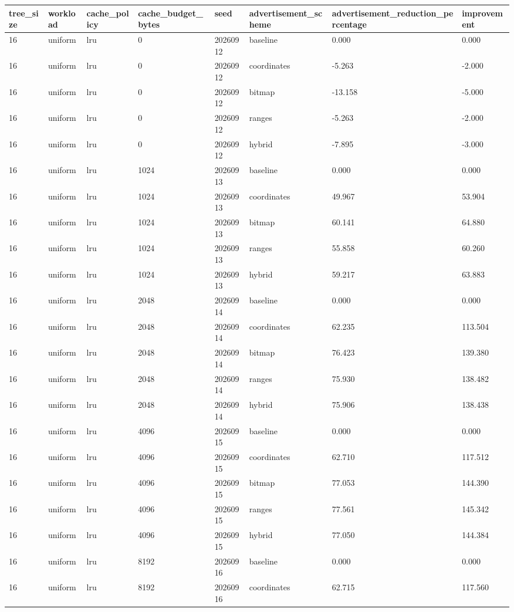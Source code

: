 \begin{tabular}{llllllll}
tree\_size & workload & cache\_policy & cache\_budget\_bytes & seed & advertisement\_scheme & advertisement\_reduction\_percentage & improvement \\ \hline
16 & uniform & lru & 0 & 20260912 & baseline & 0.000 & 0.000 \\
16 & uniform & lru & 0 & 20260912 & coordinates & -5.263 & -2.000 \\
16 & uniform & lru & 0 & 20260912 & bitmap & -13.158 & -5.000 \\
16 & uniform & lru & 0 & 20260912 & ranges & -5.263 & -2.000 \\
16 & uniform & lru & 0 & 20260912 & hybrid & -7.895 & -3.000 \\
16 & uniform & lru & 1024 & 20260913 & baseline & 0.000 & 0.000 \\
16 & uniform & lru & 1024 & 20260913 & coordinates & 49.967 & 53.904 \\
16 & uniform & lru & 1024 & 20260913 & bitmap & 60.141 & 64.880 \\
16 & uniform & lru & 1024 & 20260913 & ranges & 55.858 & 60.260 \\
16 & uniform & lru & 1024 & 20260913 & hybrid & 59.217 & 63.883 \\
16 & uniform & lru & 2048 & 20260914 & baseline & 0.000 & 0.000 \\
16 & uniform & lru & 2048 & 20260914 & coordinates & 62.235 & 113.504 \\
16 & uniform & lru & 2048 & 20260914 & bitmap & 76.423 & 139.380 \\
16 & uniform & lru & 2048 & 20260914 & ranges & 75.930 & 138.482 \\
16 & uniform & lru & 2048 & 20260914 & hybrid & 75.906 & 138.438 \\
16 & uniform & lru & 4096 & 20260915 & baseline & 0.000 & 0.000 \\
16 & uniform & lru & 4096 & 20260915 & coordinates & 62.710 & 117.512 \\
16 & uniform & lru & 4096 & 20260915 & bitmap & 77.053 & 144.390 \\
16 & uniform & lru & 4096 & 20260915 & ranges & 77.561 & 145.342 \\
16 & uniform & lru & 4096 & 20260915 & hybrid & 77.050 & 144.384 \\
16 & uniform & lru & 8192 & 20260916 & baseline & 0.000 & 0.000 \\
16 & uniform & lru & 8192 & 20260916 & coordinates & 62.715 & 117.560 \\

\end{tabular}
